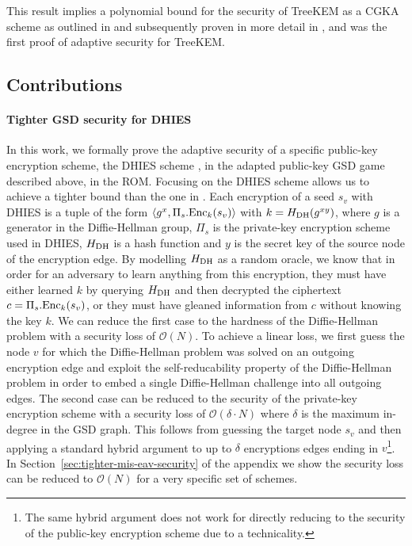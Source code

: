 This result implies a polynomial bound for the security of TreeKEM as a CGKA scheme as outlined in \cite[Theorem 4]{ttkem} and subsequently proven in more detail in \cite[Theorem 12]{modular-group-messaging}, and was the first proof of adaptive security for TreeKEM.

\subsection{Contributions}

\paragraph{Tighter GSD security for DHIES} In this work, we formally prove the adaptive security of a specific public-key encryption scheme, the DHIES  scheme \cite{dhies}, in the adapted public-key GSD game described above, in the ROM. Focusing on the DHIES scheme allows us to achieve a tighter bound than the one in \cite{ttkem}. Each encryption of a seed $s_v$ with DHIES is a tuple of the form $\langle g^{x}, \Pi_s.\mathrm{Enc}_{k}(s_v) \rangle$ with $k = H_\mathrm{DH}(g^{x y})$, where $g$ is a generator in the Diffie-Hellman group, $\Pi_s$ is the private-key encryption scheme used in DHIES, $H_\mathrm{DH}$ is a hash function and $y$ is the secret key of the source node of the encryption edge. By modelling $H_\mathrm{DH}$ as a random oracle, we know that in order for an adversary to learn anything from this encryption, they must have either learned $k$ by querying $H_\mathrm{DH}$ and then decrypted the ciphertext $c = \Pi_s.\mathrm{Enc}_{k}(s_v)$, or they must have gleaned information from $c$ without knowing the key $k$. We can reduce the first case to the hardness of the Diffie-Hellman problem with a security loss of $\mathcal{O}(N)$. To achieve a linear loss, we first guess the node $v$ for which the Diffie-Hellman problem was solved on an outgoing encryption edge and exploit the self-reducability property of the Diffie-Hellman problem in order to embed a single Diffie-Hellman challenge into all outgoing edges. The second case can be reduced to the security of the private-key encryption scheme with a security loss of $\mathcal{O}(\delta \cdot N)$ where $\delta$ is the maximum in-degree in the GSD graph.
This follows from guessing the target node $s_v$ and then applying a standard hybrid argument to up to $\delta$ encryptions edges ending in $v$\footnote{The same hybrid argument does not work for directly reducing to the security of the public-key encryption scheme due to a technicality.}. In Section~\ref{sec:tighter-mis-eav-security} of the appendix we show the security loss can be reduced to $\mathcal{O}(N)$ for a very specific set of schemes.

